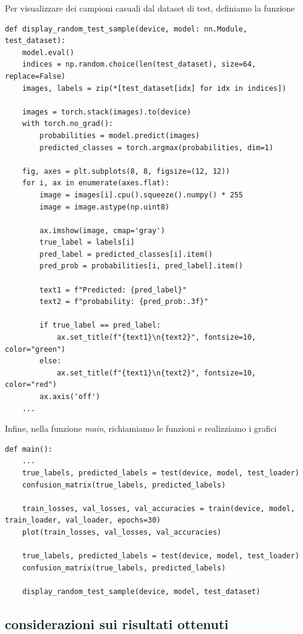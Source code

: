 \newpage
Per visualizzare dei campioni casuali dal dataset di test, definiamo la funzione 
\begin{lstlisting}
def display_random_test_sample(device, model: nn.Module, test_dataset):
    model.eval()
    indices = np.random.choice(len(test_dataset), size=64, replace=False)
    images, labels = zip(*[test_dataset[idx] for idx in indices])

    images = torch.stack(images).to(device)
    with torch.no_grad():
        probabilities = model.predict(images)
        predicted_classes = torch.argmax(probabilities, dim=1)

    fig, axes = plt.subplots(8, 8, figsize=(12, 12))
    for i, ax in enumerate(axes.flat):
        image = images[i].cpu().squeeze().numpy() * 255
        image = image.astype(np.uint8)

        ax.imshow(image, cmap='gray')
        true_label = labels[i]
        pred_label = predicted_classes[i].item()
        pred_prob = probabilities[i, pred_label].item()
        
        text1 = f"Predicted: {pred_label}"
        text2 = f"probability: {pred_prob:.3f}"

        if true_label == pred_label:
            ax.set_title(f"{text1}\n{text2}", fontsize=10, color="green")
        else:
            ax.set_title(f"{text1}\n{text2}", fontsize=10, color="red")
        ax.axis('off')
    ...
\end{lstlisting}


Infine, nella funzione \textit{main}, richiamiamo le funzioni e realizziamo i grafici
\begin{lstlisting}
def main():
    ...
    true_labels, predicted_labels = test(device, model, test_loader)
    confusion_matrix(true_labels, predicted_labels)

    train_losses, val_losses, val_accuracies = train(device, model, train_loader, val_loader, epochs=30)
    plot(train_losses, val_losses, val_accuracies)

    true_labels, predicted_labels = test(device, model, test_loader)
    confusion_matrix(true_labels, predicted_labels)

    display_random_test_sample(device, model, test_dataset)
\end{lstlisting}

\subsection{considerazioni sui risultati ottenuti}

